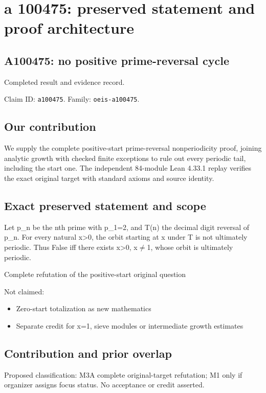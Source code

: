\documentclass[11pt,a4paper]{article}
\begin{document}
\section{a 100475: preserved statement and proof architecture}
\subsection{A100475: no positive prime-reversal cycle}
Completed result and evidence record.

Claim ID: \texttt{a100475}. Family: \texttt{oeis-a100475}.

\subsection{Our contribution}
We supply the complete positive-start prime-reversal nonperiodicity proof, joining analytic growth with checked finite exceptions to rule out every periodic tail, including the start one. The independent 84-module Lean 4.33.1 replay verifies the exact original target with standard axioms and source identity.

\subsection{Exact preserved statement and scope}
Let p\_n be the nth prime with p\_1=2, and T(n) the decimal digit reversal of p\_n. For every natural x>0, the orbit starting at x under T is not ultimately periodic. Thus False iff there exists x>0, x\ensuremath{\neq}1, whose orbit is ultimately periodic.

Complete refutation of the positive-start original question

Not claimed:

\begin{itemize}
\item Zero-start totalization as new mathematics
\end{itemize}
\begin{itemize}
\item Separate credit for x=1, sieve modules or intermediate growth estimates
\end{itemize}
\subsection{Contribution and prior overlap}
Proposed classification: M3A complete original-target refutation; M1 only if organizer assigns focus status. No acceptance or credit asserted.
\end{document}
